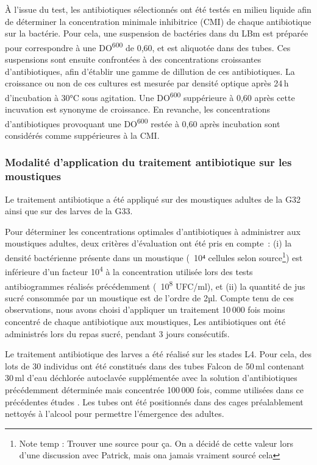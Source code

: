 À l’issue du test, les antibiotiques sélectionnés ont été testés en milieu liquide afin de déterminer la concentration minimale inhibitrice (CMI) de chaque antibiotique sur la bactérie.
Pour cela, une suspension de bactéries dans du LBm est préparée pour correspondre à une DO\textsuperscript{600} de 0,60, et est aliquotée dans des tubes.
Ces suspensions sont ensuite confrontées à des concentrations croissantes d'antibiotiques, afin d'établir une gamme de dillution de ces antibiotiques.
La croissance ou non de ces cultures est mesurée par densité optique après 24\,h d'incubation à 30°C sous agitation.
Une DO\textsuperscript{600} suppérieure à 0,60 après cette incuvation est synonyme de croissance. En revanche, les concentrations d'antibiotiques provoquant une DO\textsuperscript{600} restée à 0,60 après incubation sont considérés comme suppérieures à la CMI.

\subsubsection{Modalité d’application du traitement antibiotique sur les moustiques}

Le traitement antibiotique a été appliqué sur des moustiques adultes de la G32 ainsi que sur des larves de la G33.

Pour déterminer les concentrations optimales d’antibiotiques à administrer aux moustiques adultes, deux critères d’évaluation ont été pris en compte :
(i) la densité bactérienne présente dans un moustique (~10⁴ cellules selon source\footnote{Note temp : Trouver une source pour ça.
On a décidé de cette valeur lors d'une discussion avec Patrick, mais ona  jamais vraiment sourcé cela}) est inférieure d’un facteur 10\textsuperscript{4} à la concentration utilisée lors des tests antibiogrammes réalisés précédemment (~10\textsuperscript{8} UFC/ml), et (ii) la quantité de jus sucré consommée par un moustique est de l’ordre de 2µl.
Compte tenu de ces observations, nous avons choisi d’appliquer un traitement 10\,000 fois moins concentré de chaque antibiotique aux moustiques, Les antibiotiques ont été administrés lors du repas sucré, pendant 3 jours consécutifs. 

Le traitement antibiotique des larves a été réalisé sur les stades L4.
Pour cela, des lots de 30 individus ont été constitués dans des tubes Falcon de 50\,ml contenant 30\,ml d’eau déchlorée autoclavée supplémentée avec la solution d’antibiotiques précédemment déterminée mais concentrée 100\,000 fois, comme utilisées dans ce précédentes études \cite{dong2009}.
Les tubes ont été positionnés dans des cages préalablement nettoyés à l’alcool pour permettre l’émergence des adultes.

